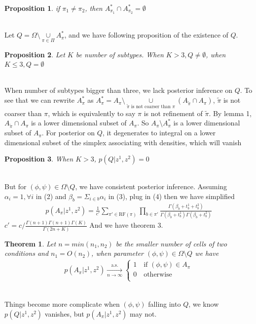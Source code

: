\documentclass[11pt]{amsart}
\newtheorem{theorem}{Theorem}
\newtheorem{prop}{Proposition}
\begin{document}
\begin{prop}
if $\pi_1 \neq \pi_2$, then $A_{\pi_1}^*\cap A_{\pi_2}^* = \emptyset$
\end{prop}
\hfill\\
Let $Q = \Omega\setminus \underset{\pi\in \Pi}\cup A_\pi^*$, and we have following proposition of the existence of $Q$.
\begin{prop}
Let $K$ be number of subtypes. When $K >  3, Q \neq \emptyset$, when $K \leq 3, Q = \emptyset$
\end{prop}
\hfill\\
When number of subtypes bigger than three, we lack posterior inference on $Q$. To see that we can rewrite $A_\pi^*$ as $A_\pi^* = A_\pi\setminus \underset{\tilde{\pi} \text{ is not coarser than } \pi }\cup (A_{\tilde{\pi}}\cap A_\pi)$, $\tilde{\pi}$ is not coarser than $\pi$, which is equivalently to say $\pi$ is not refinement of $\tilde{\pi}$. By lemma 1, $A_{\tilde{\pi}}\cap A_\pi$ is a lower dimensional subset of $A_\pi$. So $A_\pi \setminus A_\pi^*$ is a lower dimensional subset of $A_\pi$. For posterior on $Q$, it degenerates to integral on a lower dimensional subset of the simplex associating with densities, which will vanish\\
\begin{prop}
When $K >  3$, $p(Q | z^1, z^2) = 0$
\end{prop}
\hfill\\
But for $(\phi, \psi)\in \Omega\setminus Q$, we have consistent posterior inference. Assuming $\alpha_i = 1, \forall i$ in (2) and $\beta_b = \Sigma_{i\in b} \alpha_i$ in (3), plug in (4) then we have simplified 
\begin{align}
p(A_\pi| z^1, z^2) = \frac{1}{c'}\sum_{\pi' \in \text{RF}(\pi)}\prod_{b\in \pi'}\frac{ \Gamma(\beta_b + t_b^1 + t_b^2)}{\Gamma(\beta_b + t_b^1)\Gamma(\beta_b + t_b^2)}
\end{align}
$c' = c/\frac{\Gamma(n + 1)\Gamma(n+1)\Gamma(K)}{\Gamma(2n + K)}$ And we have theorem 3.\\
\begin{theorem} Let $n = min(n_1, n_2)$ be the smaller number of cells of two conditions and $n_1 = O(n_2)$, when parameter $(\phi, \psi)\in \Omega\setminus Q $ we have 
\begin{eqnarray*}
    p(A_{\pi} | z^1, z^2) \xrightarrow[n\rightarrow\infty]{\text{a.s.}}\left\{
                \begin{array}{ll}
                 1 \quad \text{if }(\phi,\psi) \in A_\pi\\
                 0 \quad \text{otherwise}\\             
                \end{array}
              \right.
\end{eqnarray*}
\end{theorem}
\hfill\\
Things become more complicate when $(\phi, \psi)$ falling into $Q$, we know $p(Q | z^1, z^2)$ vanishes, but $p(A_\pi | z^1, z^2)$ may not. 
\end{document}
